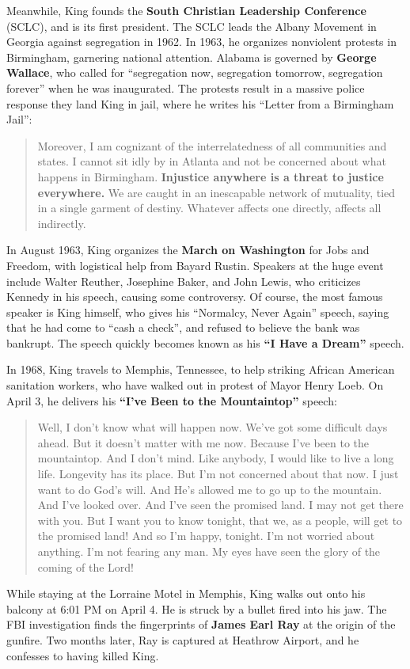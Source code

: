 Meanwhile, King founds the \textbf{South Christian Leadership Conference} (SCLC), and is its first president.
The SCLC leads the Albany Movement in Georgia against segregation in 1962.
In 1963, he organizes nonviolent protests in Birmingham, garnering national attention.
Alabama is governed by \textbf{George Wallace},
who called for ``segregation now, segregation tomorrow, segregation forever'' when he was inaugurated.
The protests result in a massive police response they land King in jail,
where he writes his ``Letter from a Birmingham Jail'':
\begin{quote}
  Moreover, I am cognizant of the interrelatedness of all communities and states.
  I cannot sit idly by in Atlanta and not be concerned about what happens in Birmingham.
  \textbf{Injustice anywhere is a threat to justice everywhere.}
  We are caught in an inescapable network of mutuality, tied in a single garment of destiny.
  Whatever affects one directly, affects all indirectly.
\end{quote}

In August 1963, King organizes the \textbf{March on Washington} for Jobs and Freedom,
with logistical help from Bayard Rustin.
Speakers at the huge event include Walter Reuther, Josephine Baker,
and John Lewis, who criticizes Kennedy in his speech, causing some controversy.
Of course, the most famous speaker is King himself, who gives his ``Normalcy, Never Again'' speech,
saying that he had come to ``cash a check'', and refused to believe the bank was bankrupt.
The speech quickly becomes known as his \textbf{``I Have a Dream''} speech.

In 1968, King travels to Memphis, Tennessee, to help striking African American sanitation workers,
who have walked out in protest of Mayor Henry Loeb.
On April 3, he delivers his \textbf{``I've Been to the Mountaintop''} speech:
\begin{quote}
  Well, I don't know what will happen now.
  We've got some difficult days ahead.
  But it doesn't matter with me now.
  Because I've been to the mountaintop.
  And I don't mind.
  Like anybody, I would like to live a long life.
  Longevity has its place.
  But I'm not concerned about that now.
  I just want to do God's will.
  And He's allowed me to go up to the mountain.
  And I've looked over.
  And I've seen the promised land.
  I may not get there with you.
  But I want you to know tonight, that we, as a people, will get to the promised land!
  And so I'm happy, tonight.
  I'm not worried about anything.
  I'm not fearing any man.
  My eyes have seen the glory of the coming of the Lord!
\end{quote}
While staying at the Lorraine Motel in Memphis,
King walks out onto his balcony at 6:01 PM on April 4.
He is struck by a bullet fired into his jaw.
The FBI investigation finds the fingerprints of \textbf{James Earl Ray} at the origin of the gunfire.
Two months later, Ray is captured at Heathrow Airport, and he confesses to having killed King.

